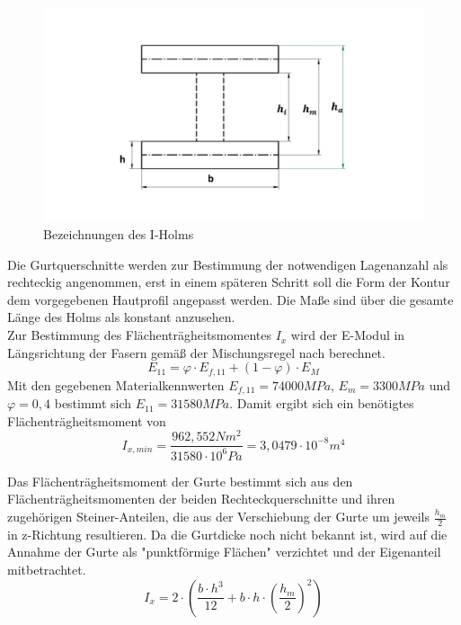 \begin{figure}[h]
	\includegraphics[width=1.0\textwidth]{Bilder/RechteckHolm.jpg}
	\caption{Bezeichnungen des I-Holms}
	\label{fig: Rechteckholm}
\end{figure}

\noindent Die Gurtquerschnitte werden zur Bestimmung der notwendigen Lagenanzahl als rechteckig angenommen, erst in einem späteren Schritt soll die Form der Kontur dem vorgegebenen Hautprofil angepasst werden. Die Maße sind über die gesamte Länge des Holms als konstant anzusehen.\\
Zur Bestimmung des Flächenträgheitsmomentes $ I_{x} $ wird der E-Modul in Längsrichtung der Fasern gemäß der Mischungsregel nach \cite{item3} berechnet.\\
\begin{equation}
 E_{11}=  \varphi\cdot E_{f,11}+\left( 1-\varphi \right) \cdot E_{M}
\end{equation}
Mit den gegebenen Materialkennwerten $ E_{f,11}=74000MPa $, $ E_{m}=3300MPa $ und $ \varphi=0,4 $ bestimmt sich $ E_{11} = 31580 MPa $. Damit ergibt sich ein benötigtes Flächenträgheitsmoment von 
\begin{equation}
	I_{x,min} = \frac{962,552Nm^{2}}{31580\cdot 10^{6}Pa} =3,0479 \cdot 10^{-8} m^{4}
\end{equation}

\noindent Das Flächenträgheitsmoment der Gurte bestimmt sich aus den Flächenträgheitsmomenten der beiden Rechteckquerschnitte und ihren zugehörigen Steiner-Anteilen, die aus der Verschiebung der Gurte um jeweils $ \frac{h_{m}}{2} $ in z-Richtung resultieren. Da die Gurtdicke noch nicht bekannt ist, wird auf die Annahme der Gurte als "punktförmige Flächen" \cite{item15} verzichtet und der Eigenanteil mitbetrachtet. 
\begin{equation}
	\label{Ix}
	I_{x}=2\cdot\left(\frac{b\cdot h^{3}}{12}+b\cdot h\cdot\left(\frac{h_{m}}{2}\right)^{2}\right)
\end{equation}

